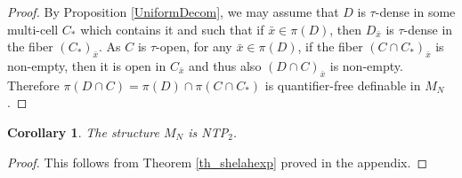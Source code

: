 \documentclass[12pt]{article}
\newtheorem{cor}[thm]{Corollary}
\theoremstyle{definition}
\theoremstyle{mystyle}
\theoremstyle{remark}
\newtheorem*{claim}{Claim}
\newcommand{\clos}[2]{#1^{(#2)}}
\begin{document}
\begin{proof}
By Proposition \ref{UniformDecom}, we may assume that $D$ is $\tau$-dense in some multi-cell $C_*$ which contains it and such that if $\bar x \in \pi(D)$, then $D_{\bar x}$ is $\tau$-dense in the fiber $(C_*)_{\bar x}$. As $C$ is $\tau$-open, for any $\bar x\in \pi(D)$, if the fiber $(C\cap C_*)_{\bar x}$ is non-empty, then it is open in $C_{\bar x}$ and thus also $(D \cap C)_{\bar x}$ is non-empty. Therefore $\pi(D\cap C)=  \pi(D)\cap \pi(C\cap C_*)$ is quantifier-free definable in $M_N$.
%
%
%
%
%
%
\end{proof}

\begin{cor}\label{ShelahExpNTP}
The structure $M_N$ is NTP$_2$.
\end{cor}
\begin{proof}
This follows from Theorem \ref{th_shelahexp} proved in the appendix.
\end{proof}
\end{document}
